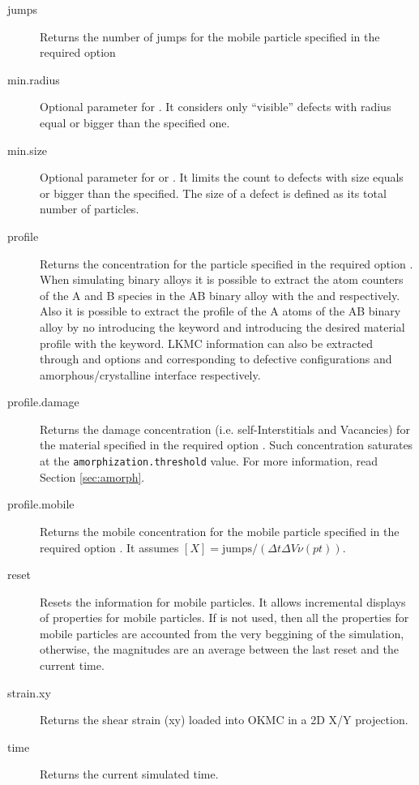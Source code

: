 \begin{description}
\item [jumps] Returns the number of jumps for the mobile particle specified in the required option 

\item [min.radius] Optional parameter for . It considers only ``visible'' defects with radius equal or bigger than the specified one.

\item [min.size] Optional parameter for  or . It limits the count to defects with size equals or bigger than the specified. The size of a defect is defined as its total number of particles.

\item [profile] Returns the concentration for the particle specified in the required option . When simulating binary alloys it is possible to extract the atom counters of the A and B species in the AB binary alloy with the  and  respectively. Also it is possible to extract the profile of the A atoms of the AB binary alloy by no introducing the  keyword and introducing the desired material profile with the  keyword. LKMC information can also be extracted through  and  options and corresponding to defective configurations and amorphous/crystalline interface respectively.

\item [profile.damage] Returns the damage concentration (i.e. self-Interstitials and Vacancies) for the material specified in the required option . Such concentration saturates at the {\tt amorphization.threshold} value. For more information, read Section \ref{sec:amorph}.

\item [profile.mobile]  Returns the mobile concentration for the mobile particle specified in the required option . It assumes $[X] = \mathrm{jumps} / (\Delta t \Delta V \nu(pt))$.

\item [reset] Resets the information for mobile particles. It allows incremental displays of properties for mobile particles. If  is not used, then all the properties for mobile particles are accounted from the very beggining of the simulation, otherwise, the magnitudes are an average between the last reset and the current time.

\item [strain.xy] Returns the shear strain (xy) loaded into OKMC in a 2D X/Y projection.

\item [time] Returns the current simulated time.

\end{description}

